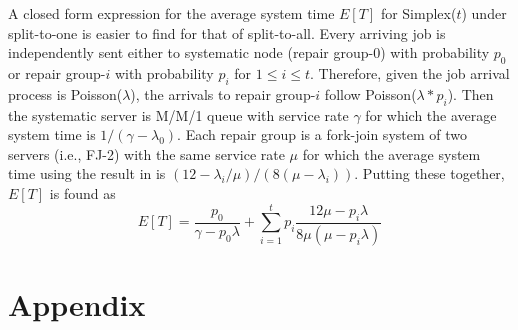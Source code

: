 \documentclass[sigconf,draft]{acmart}
\begin{document}
A closed form expression for the average system time $E[T]$ for Simplex($t$) under split-to-one is easier to find for that of split-to-all. Every arriving job is independently sent either to systematic node (repair group-$0$) with probability $p_0$ or repair group-$i$ with probability $p_i$ for $1 \leq i \leq t$. Therefore, given the job arrival process is Poisson($\lambda$), the arrivals to repair group-$i$ follow Poisson($\lambda*p_i$). Then the systematic server is M/M/1 queue with service rate $\gamma$ for which the average system time is $1/(\gamma-\lambda_0)$. Each repair group is a fork-join system of two servers (i.e., FJ-2) with the same service rate $\mu$ for which the average system time using the result in \cite{nelson1988approximate} is $(12-\lambda_i/\mu)/(8(\mu-\lambda_i))$. Putting these together, $E[T]$ is found as
\begin{equation}
  E[T] = \frac{p_0}{\gamma-p_0\lambda} + \sum_{i=1}^{t} p_i\frac{12\mu-p_i\lambda}{8\mu(\mu-p_i\lambda)}
\end{equation}

\section{Appendix}
\end{document}
